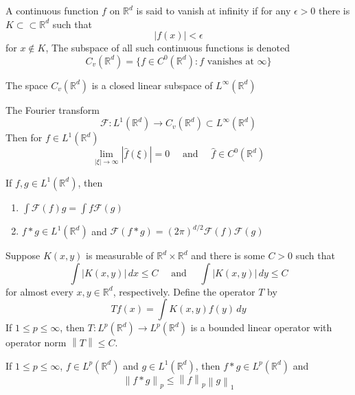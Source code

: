 \documentclass{article}
\newcommand{\norm}[1]{\left\lVert#1\right\rVert}
\newcommand{\RR}{\mathbb{R}}
\begin{document}
\begin{principle}
  A continuous function $f$ on $\mathbb{R}^d$ is said to vanish at infinity if for any $\epsilon > 0$ there is $K \subset\subset \mathbb{R}^d$ such that
  \begin{equation*}
    |f(x)| < \epsilon
  \end{equation*}
  for $x \not\in K$, The subspace of all such continuous functions is denoted
  \begin{equation*}
    C_v(\mathbb{R}^d) = \{f \in C^0(\mathbb{R}^d): \text{$f$ vanishes at $\infty$}\}
  \end{equation*}
\end{principle}

\begin{theorem}
  The space $C_v(\mathbb{R}^d)$ is a closed linear subspace of $L^\infty(\mathbb{R}^d)$
\end{theorem}

\begin{theorem}
  The Fourier transform
  \begin{equation*}
    \mathcal{F}: L^1(\mathbb{R}^d) \to C_v(\mathbb{R}^d) \subset L^\infty(\mathbb{R}^d)
  \end{equation*}
  Then for $f \in L^1(\mathbb{R}^d)$
  \begin{equation*}
    \lim_{|\xi| \to \infty}|\hat{f}(\xi)| = 0 \quad \text{ and } \quad \hat{f} \in C^0(\mathbb{R}^d)
  \end{equation*}
\end{theorem}
\begin{proposition}
  If $f,g \in L^1(\mathbb{R}^d)$, then
  \begin{enumerate}
    \item $\int \mathcal{F}(f)g = \int f\mathcal{F}(g)$ 
  \item $f * g \in L^1(\mathbb{R}^d)$ and $\mathcal{F}(f * g) = (2\pi)^{d/2}\mathcal{F}(f)\mathcal{F}(g)$
  \end{enumerate}
\end{proposition}
\begin{theorem}
  Suppose $K(x,y)$ is measurable of $\RR^d \times \RR^d$ and there is some $C > 0$ such that
  \begin{equation*}
    \int |K(x,y)| \, dx \leq C \quad \text{ and } \quad \int |K(x,y)| \, dy \leq C
  \end{equation*}
  for almost every $x,y \in \RR^d$, respectively. Define the operator $T$ by
  \begin{equation*}
    Tf(x) = \int K(x,y) f(y) \, dy
  \end{equation*}
  If $1 \leq p \leq \infty$, then $T: L^p(\RR^d) \to L^p(\RR^d)$ is a bounded linear operator with operator norm $\norm{T} \leq C$.
\end{theorem}
\begin{proposition}
  If $1 \leq p \leq \infty$, $f \in L^p(\RR^d)$ and $g \in L^1(\RR^d)$, then $f * g \in L^p(\RR^d)$ and
  \begin{equation*}
    \norm{f * g}_p \leq \norm{f}_p \norm{g}_1
  \end{equation*}
\end{proposition}
\end{document}
